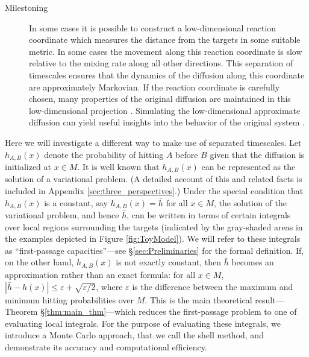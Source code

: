 \documentclass[12pt, nofootinbib,english, amsmath, amssymb, aps, priprint, graphicx,floatfix]{revtex4-1}
\theoremstyle{plain}
\theoremstyle{definition}
\theoremstyle{plain}
\begin{document}
\begin{description}
    \item[Milestoning] In some cases it is possible to construct a low-dimensional reaction coordinate which measures the distance from the targets in some suitable metric.  In some cases the movement along this reaction coordinate is slow relative to the mixing rate along all other directions.  This separation of timescales ensures that the dynamics of the diffusion along this coordinate are approximately Markovian.  If the reaction coordinate is carefully chosen, many properties of the original diffusion are maintained in this low-dimensional projection \cite{E2006-fm}.  Simulating the low-dimensional approximate diffusion can yield useful insights into the behavior of the original system \cite{Bello-Rivas2015-ld}.  
\end{description}

Here we will investigate a different way to make use of separated timescales. Let $h_{A,B}(x)$ denote
the probability of hitting $A$ before $B$ given that the diffusion
is initialized at $x\in M$.
It is well known that $h_{A,B}(x)$ can be represented as the 
solution of a variational problem. (A detailed account of this and related facts is included in Appendix \ref{sec:three_perspectives}.)  Under the special condition that $h_{A,B}(x)$ is a constant, say 
$h_{A,B}(x)=\bar{h}$ for all $x\in M$, the solution of the variational problem, and hence $\bar{h}$, can be written in terms of certain integrals over local regions surrounding the targets
(indicated by
the gray-shaded areas in the examples depicted in Figure \ref{fig:ToyModel}).
We will refer to these integrals as 
``first-passage capacities''---see \S\ref{sec:Preliminaries} for the
formal definition. If, on the other hand, $h_{A,B}(x)$ is not exactly constant, then $\bar{h}$ becomes an approximation rather than an exact formula: for all $x\in M$,
$|\bar h - h(x) |\leq \varepsilon + \sqrt{\varepsilon/2}$, where $\varepsilon$ is the difference between the maximum and minimum hitting probabilities over $M$. This is the main theoretical result---Theorem \S\ref{thm:main_thm}---which reduces the first-passage problem to one of evaluating local integrals. 
For the purpose of evaluating these integrals, we introduce a Monte Carlo approach, that we call the shell method, and  demonstrate its accuracy and computational efficiency.
\end{document}

